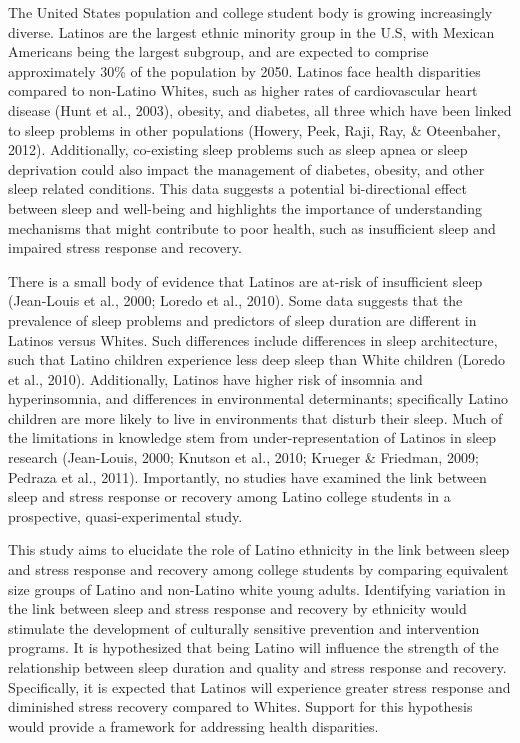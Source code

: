 \documentclass[man, fleqn, noextraspace]{apa6}
\begin{document}
The United States population and college student body is growing increasingly diverse. Latinos are the largest ethnic minority group in the U.S, with Mexican Americans being the largest subgroup, and are expected to comprise approximately 30\% of the population by 2050. Latinos face health disparities compared to non-Latino Whites, such as higher rates of cardiovascular heart disease (Hunt et al., 2003), obesity, and diabetes, all three which have been linked to sleep problems in other populations (Howery, Peek, Raji, Ray, \& Oteenbaher, 2012). Additionally, co-existing sleep problems such as sleep apnea or sleep deprivation could also impact the management of diabetes, obesity, and other sleep related conditions. This data suggests a potential bi-directional effect between sleep and well-being and highlights the importance of understanding mechanisms that might contribute to poor health, such as insufficient sleep and impaired stress response and recovery.

There is a small body of evidence that Latinos are at-risk of insufficient sleep (Jean-Louis et al., 2000; Loredo et al., 2010). Some data suggests that the prevalence of sleep problems and predictors of sleep duration are different in Latinos versus Whites. Such differences include differences in sleep architecture, such that Latino children experience less deep sleep than White children (Loredo et al., 2010). Additionally, Latinos have higher risk of insomnia and hyperinsomnia, and differences in environmental determinants; specifically Latino children are more likely to live in environments that disturb their sleep. Much of the limitations in knowledge stem from under-representation of Latinos in sleep research (Jean-Louis, 2000; Knutson et al., 2010; Krueger \& Friedman, 2009; Pedraza et al., 2011). Importantly, no studies have examined the link between sleep and stress response or recovery among Latino college students in a prospective, quasi-experimental study.

This study aims to elucidate the role of Latino ethnicity in the link between sleep and stress response and recovery among college students by comparing equivalent size groups of Latino and non-Latino white young adults. Identifying variation in the link between sleep and stress response and recovery by ethnicity would stimulate the development of culturally sensitive prevention and intervention programs. It is hypothesized that being Latino will influence the strength of the relationship between sleep duration and quality and stress response and recovery. Specifically, it is expected that Latinos will experience greater stress response and diminished stress recovery compared to Whites. Support for this hypothesis would provide a framework for addressing health disparities.
\end{document}
